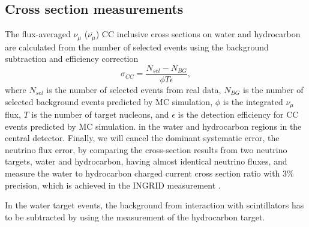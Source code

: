 \subsection{Cross section measurements}
The flux-averaged $\nu_{\mu}$ ($\overline{\nu_{\mu}}$) CC inclusive cross sections on water and hydrocarbon are calculated from the number of selected events
using the background subtraction and efficiency correction
\begin{equation}
\sigma_{CC} = \frac{N_{sel}-N_{BG}}{\phi T \epsilon},
\end{equation}
where $N_{sel}$ is the number of selected events from real data,
$N_{BG}$ is the number of selected background events predicted by MC simulation,
$\phi$ is the integrated $\nu_{\mu}$ flux, $T$ is the number of target nucleons,
and $\epsilon$ is the detection efficiency for CC events predicted by MC simulation.
in the water and hydrocarbon regions in the central detector.
Finally, we will cancel the dominant systematic error, the neutrino flux error, by comparing the cross-section results from two neutrino targets, water and hydrocarbon, having almost identical neutrino fluxes, and measure the water to hydrocarbon charged current cross section ratio with 3\% precision, which is achieved in the INGRID measurement \cite{ingrid_ccinclusive}.



In the water target events, the background from interaction with scintillators has to be subtracted by using the measurement of the hydrocarbon target.

